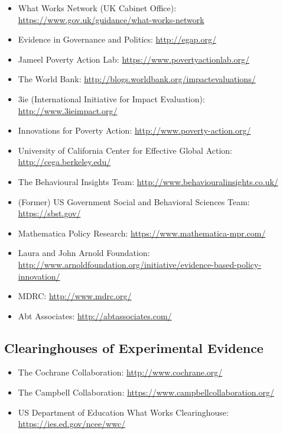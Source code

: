 \documentclass[12pt,a4paper]{article}
\begin{document}
\begin{itemize}

\item What Works Network (UK Cabinet Office): \url{https://www.gov.uk/guidance/what-works-network}

\item Evidence in Governance and Politics: \url{http://egap.org/}

\item Jameel Poverty Action Lab: \url{https://www.povertyactionlab.org/}

\item The World Bank: \url{http://blogs.worldbank.org/impactevaluations/}

\item 3ie (International Initiative for Impact Evaluation): \url{http://www.3ieimpact.org/}

\item Innovations for Poverty Action: \url{http://www.poverty-action.org/}

\item University of California Center for Effective Global Action: \url{http://cega.berkeley.edu/}

\item The Behavioural Insights Team: \url{http://www.behaviouralinsights.co.uk/}

\item (Former) US Government Social and Behavioral Sciences Team: \url{https://sbst.gov/}

\item Mathematica Policy Research: \url{https://www.mathematica-mpr.com/}

\item Laura and John Arnold Foundation: \url{http://www.arnoldfoundation.org/initiative/evidence-based-policy-innovation/}

\item MDRC: \url{http://www.mdrc.org/}

\item Abt Associates: \url{http://abtassociates.com/}

\end{itemize}

\subsection*{Clearinghouses of Experimental Evidence}

\begin{itemize}
\item The Cochrane Collaboration: \url{http://www.cochrane.org/}

\item The Campbell Collaboration: \url{https://www.campbellcollaboration.org/}

\item US Department of Education What Works Clearinghouse: \url{https://ies.ed.gov/ncee/wwc/}

\end{itemize}
\end{document}
